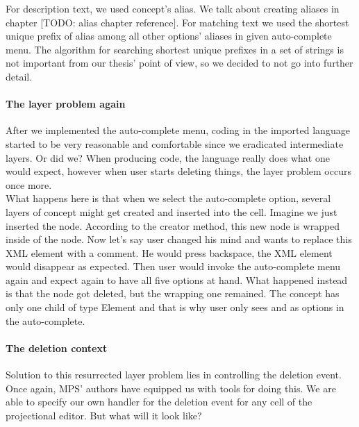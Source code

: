 For description text, we used concept's alias. We talk about creating aliases in chapter [TODO: alias chapter reference]. For matching text we used the shortest unique prefix of alias among all other options' aliases in given auto-complete menu. The algorithm for searching shortest unique prefixes in a set of strings is not important from our thesis' point of view, so we decided to not go into further detail.

\paragraph{The layer problem again}

After we implemented the auto-complete menu, coding in the imported language started to be very reasonable and comfortable since we eradicated intermediate layers. Or did we? When producing code, the language really does what one would expect, however when user starts deleting things, the layer problem occurs once more. 
\\

What happens here is that when we select the auto-complete option, several layers of concept might get created and inserted into the cell. Imagine we just inserted the  node. According to the creator method, this new node is wrapped inside of the  node. Now let's say user changed his mind and wants to replace this XML element with a comment. He would press backspace, the XML element would disappear as expected. Then user would invoke the auto-complete menu again and expect again to have all five options at hand. What happened instead is that the  node got deleted, but the wrapping  one remained. The  concept has only one child of type Element and that is why user only sees  and  as options in the auto-complete.

\paragraph {The deletion context}

Solution to this resurrected layer problem lies in controlling the deletion event. Once again, MPS' authors have equipped us with tools for doing this. We are able to specify our own handler for the deletion event for any cell of the projectional editor. But what will it look like?
\\

